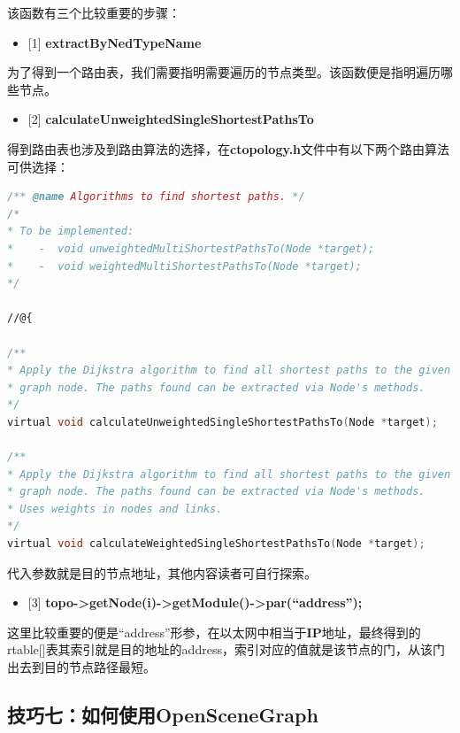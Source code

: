 该函数有三个比较重要的步骤：

\begin{itemize}
\item {[1]} \textbf{extractByNedTypeName}

\end{itemize}

为了得到一个路由表，我们需要指明需要遍历的节点类型。该函数便是指明遍历哪些节点。

\begin{itemize}
\item {[2]} \textbf{calculateUnweightedSingleShortestPathsTo}

\end{itemize}

得到路由表也涉及到路由算法的选择，在\textbf{ctopology.h}文件中有以下两个路由算法可供选择：

\begin{lstlisting}[language=c]
/** @name Algorithms to find shortest paths. */
/*
* To be implemented:
*    -  void unweightedMultiShortestPathsTo(Node *target);
*    -  void weightedMultiShortestPathsTo(Node *target);
*/

//@{

/**
* Apply the Dijkstra algorithm to find all shortest paths to the given
* graph node. The paths found can be extracted via Node's methods.
*/
virtual void calculateUnweightedSingleShortestPathsTo(Node *target);

/**
* Apply the Dijkstra algorithm to find all shortest paths to the given
* graph node. The paths found can be extracted via Node's methods.
* Uses weights in nodes and links.
*/
virtual void calculateWeightedSingleShortestPathsTo(Node *target);

\end{lstlisting}

代入参数就是目的节点地址，其他内容读者可自行探索。

\begin{itemize}
\item {[3]} \textbf{topo->getNode(i)->getModule()->par(``address'');}

\end{itemize}

这里比较重要的便是“address”形参，在以太网中相当于\textbf{IP}地址，最终得到的rtable{[]}表其索引就是目的地址的address，索引对应的值就是该节点的门，从该门出去到目的节点路径最短。

\subsection{技巧七：如何使用OpenSceneGraph}
\label{技巧七：如何使用openscenegraph}

